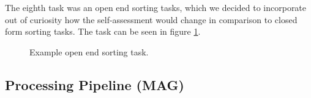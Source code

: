 \documentclass[../main/main.tex]{subfiles}
\begin{document}
	 The eighth task was an open end sorting tasks, which we decided to incorporate out of curiosity how the self-assessment would change in comparison to closed form sorting tasks. The task can be seen in figure \ref{fig:example-task2}.
	 
	 \begin{figure}[h]
	 	\label{fig:example-task2}
	 	\centering
	 	\captionsetup{justification=centering}
	 	\caption{Example open end sorting task.}
 	\end{figure} 
	 

	\subsection{Processing Pipeline (MAG)}
	
\end{document}
